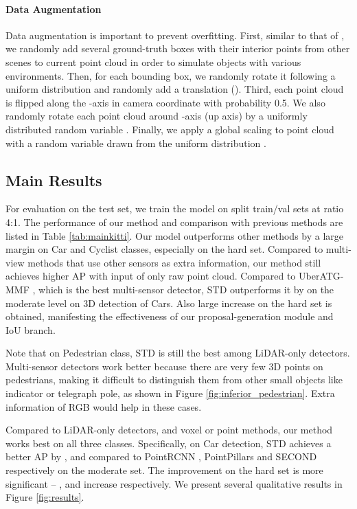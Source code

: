 \documentclass[10pt,twocolumn,letterpaper]{article}
\begin{document}
\vspace{-0.1in}
\paragraph{Data Augmentation}
Data augmentation is important to prevent overfitting. First, similar to that of \cite{yan2018second}, we randomly add several ground-truth boxes with their interior points from other scenes to current point cloud in order to simulate objects with various environments. Then, for each bounding box, we randomly rotate it following a uniform distribution  and randomly add a translation (). Third, each point cloud is flipped along the -axis in camera coordinate with probability 0.5. We also randomly rotate each point cloud around -axis (up axis) by a uniformly distributed random variable . Finally, we apply a global scaling to point cloud with a random variable drawn from the uniform distribution .



\subsection{Main Results}

For evaluation on the test set, we train the model on split train/val sets at ratio 4:1.
The performance of our method and comparison with previous methods are listed in Table \ref{tab:mainkitti}. Our model outperforms other methods by a large margin on Car and Cyclist classes, especially on the hard set. Compared to multi-view methods that use other sensors as extra information, our method still achieves higher AP with input of only raw point cloud. Compared to UberATG-MMF \cite{Liang2019CVPR}, which is the best multi-sensor detector, STD outperforms it by  on the moderate level on 3D detection of Cars. Also large increase  on the hard set is obtained, manifesting the effectiveness of our proposal-generation module and IoU branch.

Note that on Pedestrian class, STD is still the best among LiDAR-only detectors. Multi-sensor detectors work better because there are very few 3D points on pedestrians, making it difficult to distinguish them from other small objects like indicator or telegraph pole, as shown in Figure \ref{fig:inferior_pedestrian}. Extra information of RGB would help in these cases.

Compared to LiDAR-only detectors, and voxel or point methods, our method works best on all three classes. Specifically, on Car detection, STD achieves a better AP by ,  and  compared to PointRCNN \cite{shi2018pointrcnn}, PointPillars \cite{lang2018pointpillars} and SECOND \cite{yan2018second} respectively on the moderate set. The improvement on the hard set is more significant -- ,  and  increase respectively. We present several qualitative results in Figure \ref{fig:results}.
\end{document}
